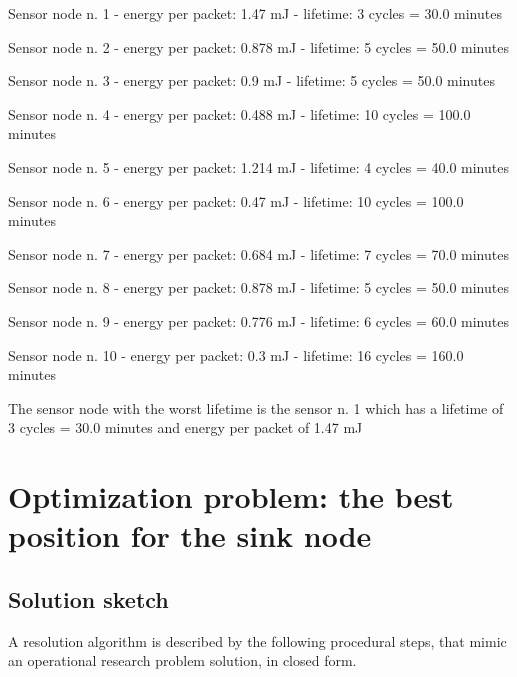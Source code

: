 \documentclass[a4paper,11pt]{article} %
\begin{document}
    \begin{tcolorbox}
        Sensor node n. 1 - energy per packet: 1.47 mJ - lifetime: 3 cycles = 30.0 minutes

        Sensor node n. 2 - energy per packet: 0.878 mJ - lifetime: 5 cycles = 50.0 minutes

        Sensor node n. 3 - energy per packet: 0.9 mJ - lifetime: 5 cycles = 50.0 minutes

        Sensor node n. 4 - energy per packet: 0.488 mJ - lifetime: 10 cycles = 100.0 minutes

        Sensor node n. 5 - energy per packet: 1.214 mJ - lifetime: 4 cycles = 40.0 minutes

        Sensor node n. 6 - energy per packet: 0.47 mJ - lifetime: 10 cycles = 100.0 minutes

        Sensor node n. 7 - energy per packet: 0.684 mJ - lifetime: 7 cycles = 70.0 minutes

        Sensor node n. 8 - energy per packet: 0.878 mJ - lifetime: 5 cycles = 50.0 minutes

        Sensor node n. 9 - energy per packet: 0.776 mJ - lifetime: 6 cycles = 60.0 minutes

        Sensor node n. 10 - energy per packet: 0.3 mJ - lifetime: 16 cycles = 160.0 minutes

        \medskip

        The sensor node with the worst lifetime is the sensor n. 1 which has a lifetime of 3 cycles = 30.0 minutes and energy per packet of 1.47 mJ
    \end{tcolorbox}


    \section{Optimization problem: the best position for the sink node}\label{sec:optimization-problem:-the-best-position-for-the-sink-node}

    \subsection{Solution sketch}\label{subsec:solution-sketch2}

    A resolution algorithm is described by the following procedural steps, that mimic an operational research problem solution, in closed form.
\end{document}
